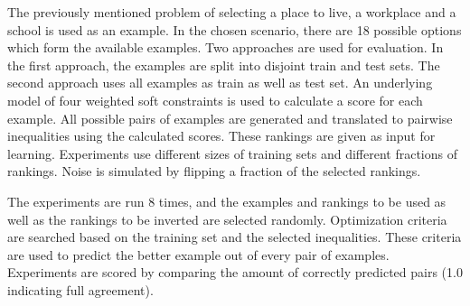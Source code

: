 \documentclass{llncs}
\begin{document}
The previously mentioned problem of selecting a place to live, a workplace and a school is used as an example.
In the chosen scenario, there are 18 possible options which form the available examples.
Two approaches are used for evaluation.
In the first approach, the examples are split into disjoint train and test sets.
The second approach uses all examples as train as well as test set.
An underlying model of four weighted soft constraints is used to calculate a score for each example.
All possible pairs of examples are generated and translated to pairwise inequalities using the calculated scores.
These rankings are given as input for learning.
Experiments use different sizes of training sets and different fractions of rankings.
Noise is simulated by flipping a fraction of the selected rankings.

The experiments are run 8 times, and the examples and rankings to be used as well as the rankings to be inverted are selected randomly.
Optimization criteria are searched based on the training set and the selected inequalities.
These criteria are used to predict the better example out of every pair of examples.
Experiments are scored by comparing the amount of correctly predicted pairs (1.0 indicating full agreement).
\end{document}
